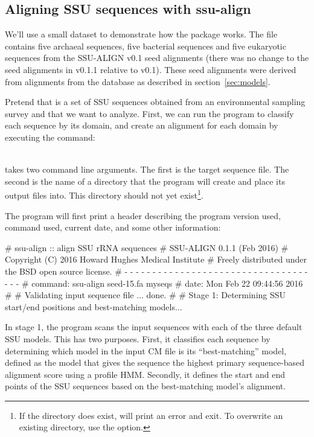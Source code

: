 \subsection{Aligning SSU sequences with ssu-align}

We'll use a small dataset to demonstrate how the package works.
The file  contains five archaeal sequences, five
bacterial sequences and five eukaryotic sequences from the
SSU-ALIGN v0.1 seed alignments (there was no change to the seed
alignments in v0.1.1 relative to v0.1). These seed alignments
were derived from alignments from the  database
\cite{CannoneGutell02} as described in section~\ref{sec:models}.

Pretend that  is a set of SSU sequences obtained from
an environmental sampling survey and that we want to analyze. First,
we can run the  program to classify each sequence by
its domain, and create an alignment for each domain by executing the
command:

\\

 takes two command line arguments. The first is the
target sequence file. The second is the name of a directory that the
program will create and place its output files into. This directory
should not yet exist\footnote{If the directory does exist,
   will print an error and exit. To overwrite an
  existing directory, use the  option.}.

The program will first print a header describing the program version
used, command used, current date, and some other information:

\begin{sreoutput}
# ssu-align :: align SSU rRNA sequences
# SSU-ALIGN 0.1.1 (Feb 2016)
# Copyright (C) 2016 Howard Hughes Medical Institute
# Freely distributed under the BSD open source license.
# - - - - - - - - - - - - - - - - - - - - - - - - - - - - - - - - - - - -
# command: ssu-align seed-15.fa myseqs
# date:    Mon Feb 22 09:44:56 2016
#
# Validating input sequence file ... done.
#
# Stage 1: Determining SSU start/end positions and best-matching models...
\end{sreoutput}

In stage 1, the program scans the input sequences with each of the
three default SSU models. This has two purposes.  First, it classifies
each sequence by determining which model in the input CM file is its
``best-matching'' model, defined as
the model that gives the sequence the highest primary sequence-based
alignment score using a profile HMM\@. Secondly, it
defines the start and end points of the SSU sequences based on the
best-matching model's alignment.

